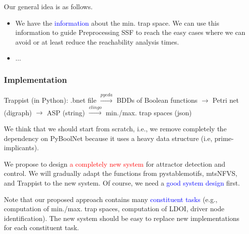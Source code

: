 \documentclass{beamer}              %
\newcommand{\blue}[1]{\textcolor{blue}{#1}}
\newcommand{\red}[1]{\textcolor{red}{#1}}
\begin{document}
\begin{frame}
{\hspace{0.1cm}

Our general idea is as follows.

\begin{itemize}
  \item We have the \blue{information} about the min. trap space. We can use this information to guide Preprocessing SSF to reach the easy cases where we can avoid or at least reduce the reachability analysis times.
  \item \(\dots\)
\end{itemize}
}

\end{frame}

\begin{frame}
\frametitle{Implementation}






Trappist (in Python): .bnet file \(\xrightarrow{pyeda}\) BDDs of Boolean functions \(\xrightarrow{}\) Petri net (digraph) \(\xrightarrow{}\) ASP (string) \(\xrightarrow{clingo}\) min./max. trap spaces (json)

\hspace{0.8cm}

We think that we should start from scratch, i.e., we remove completely the dependency on PyBoolNet because it uses a heavy data structure (i.e, prime-implicants).

\hspace{0.8cm}

We propose to design \red{a completely new system} for attractor detection and control.
We will gradually adapt the functions from pystablemotifs, mtsNFVS, and Trappist to the new system.
Of course, we need a \blue{good system design} first.

\hspace{0.8cm}

Note that our proposed approach contains many \blue{constituent tasks} (e.g., computation of min./max. trap spaces, computation of LDOI, driver node identification).
The new system should be easy to replace new implementations for each constituent task.

\end{frame}
\end{document}
